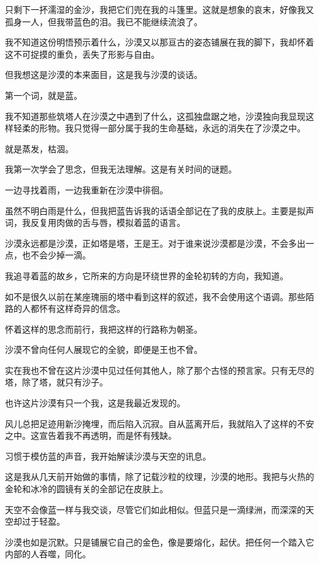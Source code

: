 \documentclass[UTF8]{article}
\begin{document}
\par 只剩下一抔濡湿的金沙，我把它们兜在我的斗篷里。这就是想象的哀末，好像我又孤身一人，但我带蓝色的泪。我已不能继续流浪了。
\par 我不知道这份明悟预示着什么，沙漠又以那亘古的姿态铺展在我的脚下，我却怀着这不可捉摸的重负，丢失了形影与自由。
\par 但我想这是沙漠的本来面目，这是我与沙漠的谈话。
\par 第一个词，就是蓝。
\par 我不知道那些筑塔人在沙漠之中遇到了什么，这孤独盘踞之地，沙漠独向我显现这样轻柔的形物。我只觉得一部分属于我的生命基础，永远的消失在了沙漠之中。
\par 就是蒸发，枯涸。
\par 我第一次学会了思念，但我无法理解。这是有关时间的谜题。
\\[0.6cm]
\par 一边寻找着雨，一边我重新在沙漠中徘徊。
\par 虽然不明白雨是什么，但我把蓝告诉我的话语全部记在了我的皮肤上。主要是拟声词，我反复用肉做的舌与唇，模拟着蓝的语言。
\par 沙漠永远都是沙漠，正如塔是塔，王是王。对于谁来说沙漠都是沙漠，不会多出一点，也不会少掉一滴。
\par 我追寻着蓝的故乡，它所来的方向是环绕世界的金轮初转的方向，我知道。
\par 如不是很久以前在某座瑰丽的塔中看到这样的叙述，我不会使用这个语调。那些陌路的人都怀有这样奇异的信念。
\par 怀着这样的思念而前行，我把这样的行路称为朝圣。
\\[0.6cm]
\par 沙漠不曾向任何人展现它的全貌，即便是王也不曾。
\par 实在我也不曾在这片沙漠中见过任何其他人，除了那个古怪的预言家。只有无尽的塔，除了塔，就只有沙子。
\par 也许这片沙漠有只一个我，这是我最近发现的。
\par 风儿总把足迹用新沙掩埋，而后陷入沉寂。自从蓝离开后，我就陷入了这样的不安之中。这宣告着我不再透明，而是怀有残缺。
\par 习惯于模仿蓝的声音，我开始解读沙漠与天空的讯息。
\par 这是我从几天前开始做的事情，除了记载沙粒的纹理，沙漠的地形。我把与火热的金轮和冰冷的圆镜有关的全部记在皮肤上。
\par 天空不会像蓝一样与我交谈，尽管它们如此相似。但蓝只是一滴绿洲，而深深的天空却过于轻盈。
\par 沙漠也如是沉默。只是铺展它自己的金色，像是要熔化，起伏。把任何一个踏入它内部的人吞噬，同化。
\end{document}
